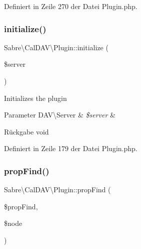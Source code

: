 Definiert in Zeile 270 der Datei Plugin.\+php.

\mbox{\label{class_sabre_1_1_cal_d_a_v_1_1_plugin_a56047b2fbc3397f3bd5ae732ec245151}} 
\subsubsection{\texorpdfstring{initialize()}{initialize()}}
{\footnotesize\ttfamily Sabre\textbackslash{}\+Cal\+D\+A\+V\textbackslash{}\+Plugin\+::initialize (\begin{DoxyParamCaption}\item[{\mbox{\hyperlink{class_sabre_1_1_d_a_v_1_1_server}{D\+A\+V\textbackslash{}\+Server}}}]{\$server }\end{DoxyParamCaption})}

Initializes the plugin


\begin{DoxyParams}[1]{Parameter}
D\+A\+V\textbackslash{}\+Server & {\em \$server} & \\
\hline
\end{DoxyParams}
\begin{DoxyReturn}{Rückgabe}
void 
\end{DoxyReturn}


Definiert in Zeile 179 der Datei Plugin.\+php.

\mbox{\label{class_sabre_1_1_cal_d_a_v_1_1_plugin_a6709e49e766f4897a2868729dcfc4e90}} 
\subsubsection{\texorpdfstring{prop\+Find()}{propFind()}}
{\footnotesize\ttfamily Sabre\textbackslash{}\+Cal\+D\+A\+V\textbackslash{}\+Plugin\+::prop\+Find (\begin{DoxyParamCaption}\item[{\mbox{\hyperlink{class_sabre_1_1_d_a_v_1_1_prop_find}{D\+A\+V\textbackslash{}\+Prop\+Find}}}]{\$prop\+Find,  }\item[{\mbox{\hyperlink{interface_sabre_1_1_d_a_v_1_1_i_node}{D\+A\+V\textbackslash{}\+I\+Node}}}]{\$node }\end{DoxyParamCaption})}

